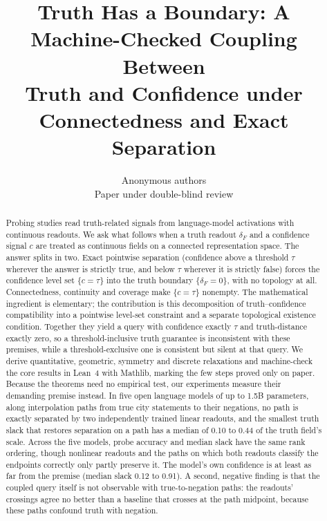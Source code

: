 \documentclass[10pt]{article}
\title{Truth Has a Boundary: A Machine-Checked Coupling Between\\
Truth and Confidence under Connectedness and Exact Separation}
\author{Anonymous authors\\Paper under double-blind review}
\theoremstyle{definition}
\theoremstyle{remark}
\newcommand{\conf}{c}
\newcommand{\dF}{\delta_{\!F}}
\begin{document}
\maketitle

\begin{abstract}
Probing studies read truth-related signals from language-model
activations with continuous readouts. We ask what follows when a truth
readout $\dF$ and a confidence signal $\conf$ are treated as continuous
fields on a connected representation space. The answer splits in two.
Exact pointwise separation (confidence above a threshold $\tau$ wherever
the answer is strictly true, and below $\tau$ wherever it is strictly
false) forces the confidence level set $\{\conf=\tau\}$ into the truth
boundary $\{\dF=0\}$, with no topology at all. Connectedness, continuity
and coverage make $\{\conf=\tau\}$ nonempty. The mathematical ingredient
is elementary; the contribution is this decomposition of truth--confidence
compatibility into a pointwise level-set constraint and a separate
topological existence condition. Together they yield a query
with confidence exactly $\tau$ and truth-distance exactly zero, so a
threshold-inclusive truth guarantee is inconsistent with these premises,
while a threshold-exclusive one is consistent but silent at that query.
We derive quantitative, geometric, symmetry and discrete relaxations and
machine-check the core results in Lean~4 with Mathlib, marking the few
steps proved only on paper. Because the theorems need no empirical test,
our experiments measure their demanding premise instead. In five open
language models of up to 1.5B parameters, along interpolation paths from
true city statements to their negations, no path is exactly separated by
two independently trained linear readouts, and the smallest truth slack
that restores separation on a path has a median of 0.10 to 0.44 of the
truth field's scale. Across the five models, probe accuracy and median
slack have the same rank ordering, though nonlinear readouts and the
paths on which both readouts classify the endpoints correctly only partly
preserve it. The model's own confidence is at least as far from the
premise (median slack 0.12 to 0.91). A second, negative finding is that the coupled query itself is not
observable with true-to-negation paths: the readouts' crossings agree no
better than a baseline that crosses at the path midpoint, because these
paths confound truth with negation.
\end{abstract}

\end{document}
